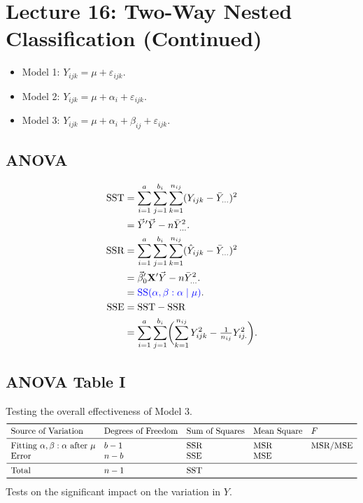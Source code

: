 \section{Lecture 16: Two-Way Nested Classification (Continued)}
\begin{itemize}
    \item Model 1: $ Y_{ijk}=\mu+\varepsilon_{ijk} $.
    \item Model 2: $ Y_{ijk}=\mu+\alpha_i+\varepsilon_{ijk} $.
    \item Model 3: $ Y_{ijk}=\mu+\alpha_i+\beta_{ij}+\varepsilon_{ijk} $.
\end{itemize}
\subsection*{ANOVA}
\begin{align*}
    \text{SST}
     & =\sum_{i=1}^{a}\sum_{j=1}^{b_i}\sum_{k=1}^{n_{ij}}(Y_{ijk}-\bar{Y}_{...})^2                           \\
     & =\vec{Y}'\vec{Y}-n\bar{Y}_{...}^2.                                                              \\
    \text{SSR}
     & =\sum_{i=1}^{a}\sum_{j=1}^{b_i}\sum_{k=1}^{n_{ij}}(\hat{Y}_{ijk}-\bar{Y}_{...})^2                     \\
     & =\vec{\beta}_0'\mathbf{X}'\vec{Y}-n\bar{Y}_{...}^2.                                             \\
     & =\textcolor{blue}{\text{SS}(\alpha,\beta:\alpha\mid \mu)}.                                            \\
    \text{SSE}
     & =\text{SST}-\text{SSR}                                                                                            \\
     & =\sum_{i=1}^{a}\sum_{j=1}^{b_i}\biggl(\sum_{k=1}^{n_{ij}}Y_{ijk}^2-\tfrac{1}{n_{ij}}Y_{ij.}^2\biggr).
\end{align*}
\subsection*{ANOVA Table I}
Testing the overall effectiveness of Model 3.
\[ \begin{array}{lllll}
        \toprule
        \text{Source of Variation}                          & \text{Degrees of Freedom} & \text{Sum of Squares} & \text{Mean Square} & F         \\
        \midrule
        \text{Fitting }\alpha,\beta:\alpha\text{ after }\mu & b-1                       & \SSR                  & \MSR               & \MSR/\MSE \\
        \text{Error}                                        & n-b                       & \SSE                  & \MSE                           \\
        \midrule
        \text{Total}                                        & n-1                       & \SST                                                   \\
        \bottomrule
    \end{array} \]
Tests on the significant impact on the variation in $ Y $.

